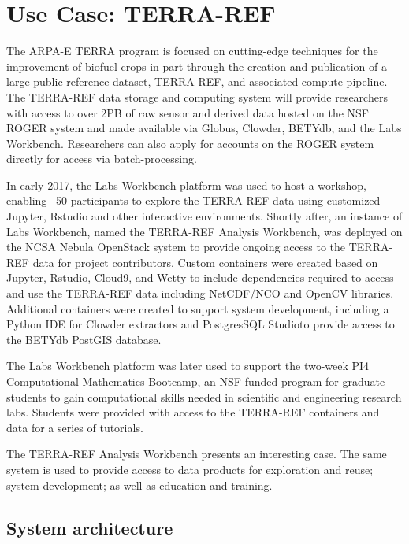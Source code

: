\documentclass{sig-alternate}
\begin{document}
\section{Use Case: TERRA-REF}

The ARPA-E TERRA program is focused on cutting-edge techniques for the improvement of biofuel crops in part through the creation and publication of a large public reference dataset, TERRA-REF, and associated compute pipeline. The TERRA-REF data storage and computing system will provide researchers with access to over 2PB of raw sensor and derived data hosted on the NSF ROGER system and made available via Globus, Clowder, BETYdb, and the Labs Workbench. Researchers can also apply for accounts on the ROGER system directly for access via batch-processing.

In early 2017, the Labs Workbench platform was used to host a workshop, enabling ~50 participants to explore the TERRA-REF data using customized Jupyter, Rstudio and other interactive environments. Shortly after, an instance of Labs Workbench, named the TERRA-REF Analysis Workbench, was deployed on the NCSA Nebula OpenStack system to provide ongoing access to the TERRA-REF data for project contributors. Custom containers were created based on Jupyter, Rstudio, Cloud9, and Wetty to include dependencies required to access and use the TERRA-REF data including NetCDF/NCO and OpenCV libraries.  Additional containers were created to support system development, including a Python IDE for Clowder extractors and PostgresSQL Studioto provide access to the BETYdb PostGIS database.

The Labs Workbench platform was later used to support the two-week PI4 Computational Mathematics Bootcamp, an NSF funded program for graduate students to gain computational skills needed in scientific and engineering research labs. Students were provided with access to the TERRA-REF containers and data for a series of tutorials. 

The TERRA-REF Analysis Workbench presents an interesting case. The same system is used to provide access to data products for exploration and reuse; system development; as well as education and training.

\subsection{System architecture}
\end{document}
